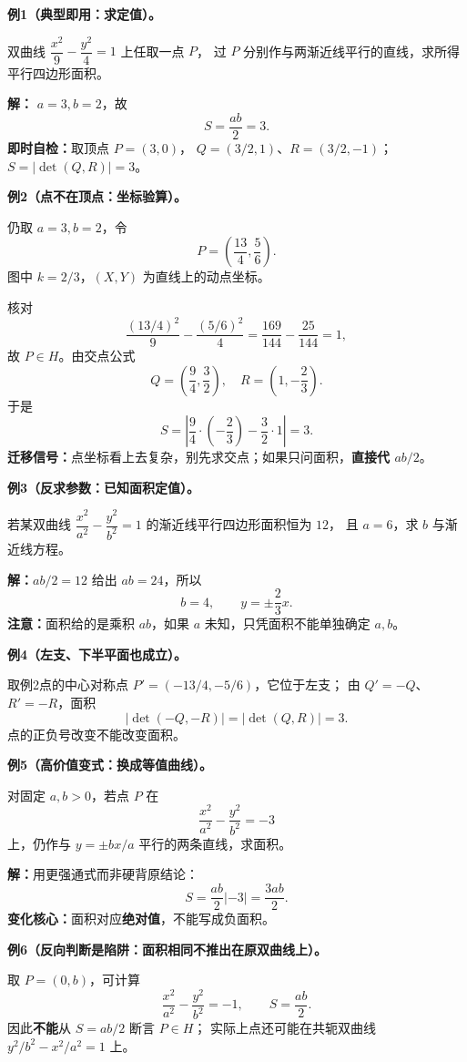 \clearpage
\begin{examplebox}
\textbf{例1（典型即用：求定值）。}

双曲线 $\dfrac{x^2}{9}-\dfrac{y^2}{4}=1$ 上任取一点 $P$，
过 $P$ 分别作与两渐近线平行的直线，求所得平行四边形面积。

\textbf{解：} $a=3,b=2$，故
\[
\boxed{S=\frac{ab}{2}=3}.
\]
\textbf{即时自检：}取顶点 $P=(3,0)$，
$Q=(3/2,1)$、$R=(3/2,-1)$；
$S=|\det(Q,R)|=3$。
\end{examplebox}

\clearpage
\begin{examplebox}
\textbf{例2（点不在顶点：坐标验算）。}

仍取 $a=3,b=2$，令
\[
P=\left(\frac{13}{4},\frac56\right).
\]
图中 $k=2/3$，$(X,Y)$ 为直线上的动点坐标。
\begin{center}

\end{center}
核对
\[
\frac{(13/4)^2}{9}-\frac{(5/6)^2}{4}
=\frac{169}{144}-\frac{25}{144}=1,
\]
故 $P\in H$。由交点公式
\[
Q=\left(\frac94,\frac32\right),\quad
R=\left(1,-\frac23\right).
\]
于是
\[
\boxed{S=\left|\frac94\cdot\left(-\frac23\right)
-\frac32\cdot1\right|=3}.
\]
\textbf{迁移信号：}点坐标看上去复杂，别先求交点；如果只问面积，\textbf{直接代 $ab/2$}。
\end{examplebox}

\clearpage
\begin{examplebox}
\textbf{例3（反求参数：已知面积定值）。}

若某双曲线 $\dfrac{x^2}{a^2}-\dfrac{y^2}{b^2}=1$ 的渐近线平行四边形面积恒为 $12$，
且 $a=6$，求 $b$ 与渐近线方程。

\textbf{解：}$ab/2=12$ 给出 $ab=24$，所以
\[
\boxed{b=4},\qquad \boxed{y=\pm\frac23x}.
\]
\textbf{注意：}面积给的是乘积 $ab$，如果 $a$ 未知，只凭面积不能单独确定 $a,b$。

\medskip
\textbf{例4（左支、下半平面也成立）。}

取例2点的中心对称点 $P'=(-13/4,-5/6)$，它位于左支；
由 $Q'=-Q$、$R'=-R$，面积
\[
|\det(-Q,-R)|=|\det(Q,R)|=\boxed{3}.
\]
点的正负号改变不能改变面积。
\end{examplebox}

\clearpage
\begin{examplebox}
\textbf{例5（高价值变式：换成等值曲线）。}

对固定 $a,b>0$，若点 $P$ 在
\[
\frac{x^2}{a^2}-\frac{y^2}{b^2}=-3
\]
上，仍作与 $y=\pm bx/a$ 平行的两条直线，求面积。

\textbf{解：}用更强通式而非硬背原结论：
\[
\boxed{S=\frac{ab}{2}\left|-3\right|=\frac{3ab}{2}}.
\]
\textbf{变化核心：}面积对应\textbf{绝对值}，不能写成负面积。

\medskip
\textbf{例6（反向判断是陷阱：面积相同不推出在原双曲线上）。}

取 $P=(0,b)$，可计算
\[
\frac{x^2}{a^2}-\frac{y^2}{b^2}=-1,
\qquad S=\frac{ab}{2}.
\]
因此\textbf{不能}从 $S=ab/2$ 断言 $P\in H$；
实际上点还可能在共轭双曲线 $y^2/b^2-x^2/a^2=1$ 上。
\end{examplebox}


